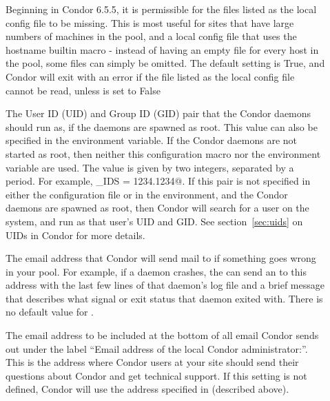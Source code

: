 \begin{description}
\item[] \label{param:RequireLocalConfigFile}
  Beginning in Condor 6.5.5, it is permissible for the files listed as the
  local config file to be missing. This is most useful for sites that have 
  large numbers of machines in the pool, and a local config file that uses
  the hostname builtin macro - instead of having an empty file for every host
  in the pool, some files can simply be omitted. The default setting is True,
  and Condor will exit with an error if the file listed as the local config 
  file cannot be read, unless  is set 
  to False 

\item[] \label{param:CondorIds}
  The User ID (UID) and Group ID (GID) pair that the Condor daemons
  should run as, if the daemons are spawned as root.
  This value can also be specified in the 
  environment variable.
  If the Condor daemons are not started as root, then neither this
   configuration macro nor the 
  environment variable are used.
  The value is given by two integers, separated by a period.  For
  example, \verb@CONDOR_IDS = 1234.1234@.
  If this pair is not specified in either the configuration file or in the
  environment, and the Condor daemons are spawned as root,
  then Condor will
  search for a \verb@condor@ user on the system, and run as that user's
  UID and GID.
  See section~\ref{sec:uids} on UIDs in Condor for more details.

\item[] \label{param:CondorAdmin} The email
  address that Condor will send mail to if something goes wrong in
  your pool.  For example, if a daemon crashes, the 
  can send an  to this address with the last few lines
  of that daemon's log file and a brief message that describes what
  signal or exit status that daemon exited with.  There is no default
  value for .
  
\item[] \label{param:CondorSupportEmail}
  The email address to be included at the bottom of all email Condor
  sends out under the label ``Email address of the local Condor
  administrator:''.  
  This is the address where Condor users at your site should send
  their questions about Condor and get technical support.
  If this setting is not defined, Condor will use the address
  specified in  (described above).


\end{description}
